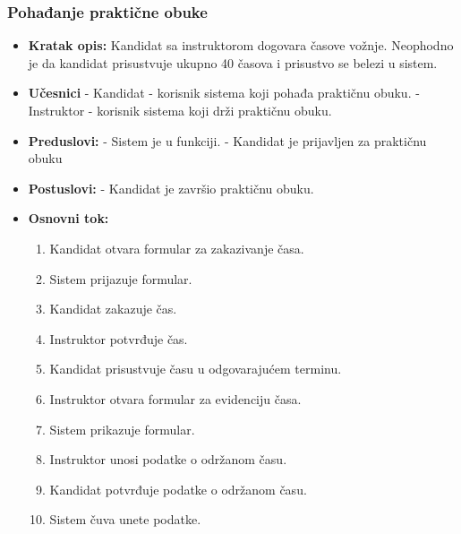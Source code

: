 \subsubsection{Pohađanje praktične obuke}

\vspace{3mm}

\begin{itemize}

\item \textbf{Kratak opis:} Kandidat sa instruktorom dogovara časove vožnje. Neophodno je da kandidat prisustvuje ukupno 40 časova i prisustvo se belezi u sistem.

\vspace{2mm}

\item \textbf{Učesnici} \newline
   - Kandidat - korisnik sistema koji pohađa praktičnu obuku.\newline   
   - Instruktor - korisnik sistema koji drži praktičnu obuku. 
   
\item \textbf{Preduslovi:} \newline
   - Sistem je u funkciji. \newline
   - Kandidat je prijavljen za praktičnu obuku 

\item \textbf{Postuslovi:} \newline
    - Kandidat je završio praktičnu obuku.

\item \textbf{Osnovni tok:}  
   \begin{enumerate}
   \item Kandidat otvara formular za zakazivanje časa.
   \item Sistem prijazuje formular.
   \item Kandidat zakazuje čas.
   \item Instruktor potvrđuje čas.
   \item Kandidat prisustvuje času u odgovarajućem terminu.
   \item Instruktor otvara formular za evidenciju časa.
   \item Sistem prikazuje formular.
   \item Instruktor unosi podatke o održanom času.
   \item Kandidat potvrđuje podatke o održanom času.
   \item Sistem čuva unete podatke. \newline
   \end{enumerate}


\end{itemize}
